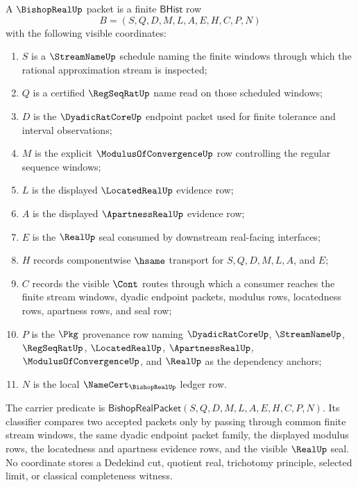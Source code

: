 \begin{definition}
\label{def:bishopreal-regular-located-carrier}
A $\BishopRealUp$ packet is a finite $\mathsf{BHist}$ row
$$
B=(S,Q,D,M,L,A,E,H,C,P,N)
$$
with the following visible coordinates:
\begin{enumerate}
\item $S$ is a $\StreamNameUp$ schedule naming the finite windows through which
the rational approximation stream is inspected;
\item $Q$ is a certified $\RegSeqRatUp$ name read on those scheduled windows;
\item $D$ is the $\DyadicRatCoreUp$ endpoint packet used for finite tolerance
and interval observations;
\item $M$ is the explicit $\ModulusOfConvergenceUp$ row controlling the regular
sequence windows;
\item $L$ is the displayed $\LocatedRealUp$ evidence row;
\item $A$ is the displayed $\ApartnessRealUp$ evidence row;
\item $E$ is the $\RealUp$ seal consumed by downstream real-facing interfaces;
\item $H$ records componentwise $\hsame$ transport for $S,Q,D,M,L,A$, and $E$;
\item $C$ records the visible $\Cont$ routes through which a consumer reaches the
finite stream windows, dyadic endpoint packets, modulus rows, locatedness rows,
apartness rows, and seal row;
\item $P$ is the $\Pkg$ provenance row naming $\DyadicRatCoreUp$,
$\StreamNameUp$, $\RegSeqRatUp$, $\LocatedRealUp$, $\ApartnessRealUp$,
$\ModulusOfConvergenceUp$, and $\RealUp$ as the dependency anchors;
\item $N$ is the local $\NameCert_{\BishopRealUp}$ ledger row.
\end{enumerate}
The carrier predicate is
$\mathsf{BishopRealPacket}(S,Q,D,M,L,A,E,H,C,P,N)$. Its classifier compares two
accepted packets only by passing through common finite stream windows, the same
dyadic endpoint packet family, the displayed modulus rows, the locatedness and
apartness evidence rows, and the visible $\RealUp$ seal. No coordinate stores a
Dedekind cut, quotient real, trichotomy principle, selected limit, or classical
completeness witness.
\end{definition}

